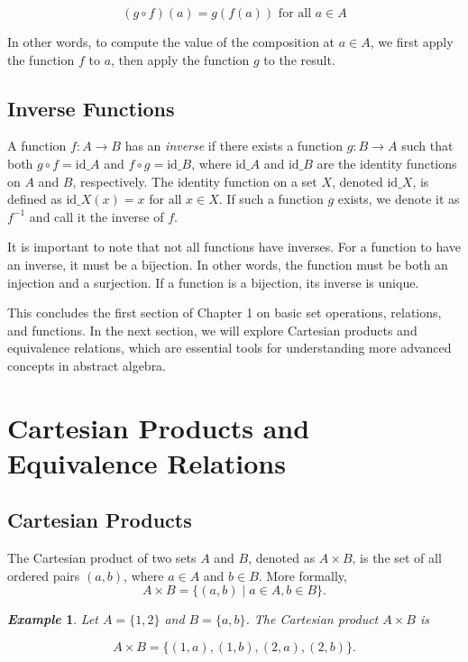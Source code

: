 \documentclass{report}
\newtheorem{example}{\textit{Example}}
\begin{document}
\[
(g \circ f)(a) = g(f(a)) \text{ for all } a \in A
\]

In other words, to compute the value of the composition at $a \in A$, we first apply the function $f$ to $a$, then apply the function $g$ to the result.

\subsection{Inverse Functions}

A function $f : A \to B$ has an \textit{inverse} if there exists a function $g : B \to A$ such that both $g \circ f = \text{id}\_A$ and $f \circ g = \text{id}\_B$, where $\text{id}\_A$ and $\text{id}\_B$ are the identity functions on $A$ and $B$, respectively. The identity function on a set $X$, denoted $\text{id}\_X$, is defined as $\text{id}\_X(x) = x$ for all $x \in X$. If such a function $g$ exists, we denote it as $f^{-1}$ and call it the inverse of $f$.

It is important to note that not all functions have inverses. For a function to have an inverse, it must be a bijection. In other words, the function must be both an injection and a surjection. If a function is a bijection, its inverse is unique.

This concludes the first section of Chapter 1 on basic set operations, relations, and functions. In the next section, we will explore Cartesian products and equivalence relations, which are essential tools for understanding more advanced concepts in abstract algebra.


\section{Cartesian Products and Equivalence Relations}

\subsection{Cartesian Products}

The Cartesian product of two sets $A$ and $B$, denoted as $A \times B$, is the set of all ordered pairs $(a, b)$, where $a \in A$ and $b \in B$. More formally,
\[
A \times B = \{(a, b) \mid a \in A, b \in B\}.
\]

\begin{example}

Let $A = \{1, 2\}$ and $B = \{a, b\}$. The Cartesian product $A \times B$ is

\[
A \times B = \{(1, a), (1, b), (2, a), (2, b)\}.
\]

\end{example}
\end{document}
